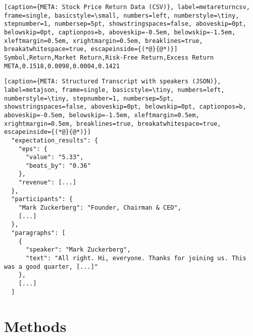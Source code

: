 \documentclass{article}
\newif\ifshowInstructions
\newcommand{\instructions}[1]{%
    \ifshowInstructions%
        \textcolor{violet}{#1}%
    \fi%
}
\begin{document}
\begin{minipage}[t]{0.45\textwidth}
\begin{lstlisting}[caption={META: Stock Price Return Data (CSV)}, label=metareturncsv, frame=single, basicstyle=\small, numbers=left, numberstyle=\tiny, stepnumber=1, numbersep=5pt, showstringspaces=false, aboveskip=0pt, belowskip=0pt, captionpos=b, aboveskip=-0.5em, belowskip=-1.5em, xleftmargin=0.5em, xrightmargin=0.5em, breaklines=true, breakatwhitespace=true, escapeinside={(*@}{@*)}]
Symbol,Return,Market Return,Risk-Free Return,Excess Return
META,0.1518,0.0098,0.0004,0.1421
\end{lstlisting}
\end{minipage}\hfill
\begin{minipage}[t]{0.45\textwidth}
\begin{lstlisting}[caption={META: Structured Transcript with speakers (JSON)}, label=metajson, frame=single, basicstyle=\tiny, numbers=left, numberstyle=\tiny, stepnumber=1, numbersep=5pt, showstringspaces=false, aboveskip=0pt, belowskip=0pt, captionpos=b, aboveskip=-0.5em, belowskip=-1.5em, xleftmargin=0.5em, xrightmargin=0.5em, breaklines=true, breakatwhitespace=true, escapeinside={(*@}{@*)}]
  "expectation_results": {
    "eps": {
      "value": "5.33",
      "beats_by": "0.36"
    },
    "revenue": [...]
  },
  "participants": {
    "Mark Zuckerberg": "Founder, Chairman & CEO",
    [...]
  },
  "paragraphs": [
    {
      "speaker": "Mark Zuckerberg",
      "text": "All right. Hi, everyone. Thanks for joining us. This was a good quarter, [...]"
    },
    [...]
  ]
\end{lstlisting}
\end{minipage}

\section{Methods}
\instructions{%
Describe your learning algorithms, proposed algorithm(s), or theoretical proof(s). Make sure to include relevant mathematical notation. For example, you can briefly include the SVM optimization objective/formula or say what the softmax function is. It is okay to use formulas from the lecture notes. For each algorithm, give a short description (\~ 1 para- graph) of how it works. Again, we are looking for your understanding of how these machine learning algorithms work. Although the teaching staff probably know the algorithms, future readers may not (reports will be posted on the class website). Additionally, if you are using a niche or cutting-edge algorithm (e.g. long short-term memory, SURF features, or anything else not covered in the class), you may want to explain your algorithm using 1/2 paragraphs. Note: Theory/algorithms projects may have an appendix showing extended proofs (see Appendix section below).
}
\end{document}
